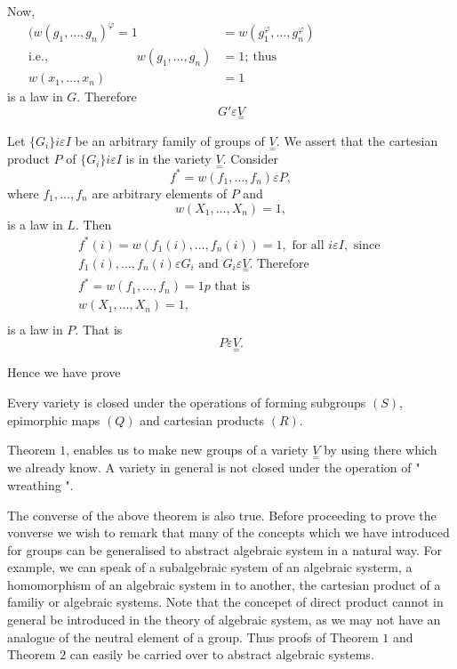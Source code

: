 Now,
\begin{align*}
  (w(g_1, \ldots, g_n)^\varphi = 1 &= w(g^\varphi_1,  \ldots, 
  g^\varphi_n)\hspace{4cm}\\ 
  \text{i.e.,}\hspace{3cm}
  w(g_1, \ldots,  g_n) & = 1 ; ~\text{thus} \\
  w(x_1, \ldots,  x_n) &= 1
\end{align*}
is a law in $G$.  Therefore
$$
G' \varepsilon \underset{=}V
$$

Let $ \{ G_i  \} i \varepsilon I $ be an arbitrary family of groups of
$ \underset{=}{V}$. We assert that the cartesian product $P$ of  $  \{
G_i  \} i \varepsilon I $ is in the variety $ \underset{=}{V}
$. Consider 
$$
f^* = w ( f_1, \ldots, f_n ) \varepsilon P, 
$$
where $ f_1, \ldots,  f_n $ are arbitrary elements of $P$ and 
$$
w ( X_1, \ldots,  X_n ) = 1,
$$
is a law in $L$. Then
\begin{gather*}
  f^* (i) = w ( f_1 (i), \ldots,  f_n (i)) = 1, \text{ for all } i
  \varepsilon I, \text{ since }\\ 
  f_1 (i), \ldots,  f_n (i)  \varepsilon  G_i  \text{ and } G_i
  \varepsilon \underset{=}{V}. \text{ Therefore }\\ 
  f^* = w ( f_1, \ldots, f_n ) = 1 p \text{ that is } \\
  w ( X_1, \ldots, X_n ) = 1, \\
\end{gather*}
is a law in $P$. That is 
$$
P \varepsilon \underset{=}{V}.
$$

Hence we have prove 
\setcounter{Theorem}{0}
\begin{Theorem} %
  Every variety is closed under the operations of forming  subgroups
  $(S)$, epimorphic maps $(Q)$ and cartesian products  $(R)$.  
\end{Theorem}

Theorem $1$, enables us to make new groups of a variety $
\underset{=}{V} $ by using there which we already know. A variety in
general is not closed under the operation of  " wreathing ". 

The converse of the above theorem is also true. Before proceeding to
prove the vonverse we wish to remark that many of the concepts which
we have introduced for groups can be generalised to abstract algebraic
system in a natural way. For example, we can speak of a subalgebraic
system of an algebraic systerm, a homomorphism of an algebraic system
in to another, the cartesian product of a familiy or algebraic
systems. Note that the concepet of direct product cannot in general be
introduced in the theory of algebraic system, as we may not have an
analogue of the neutral element of a group. Thus proofs of Theorem $1$
and Theorem $2$ can easily be  carried over to abstract algebraic
systems. 

